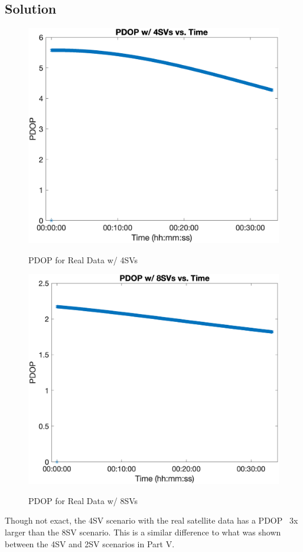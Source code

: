 \documentclass{article}
\begin{document}
\subsection*{Solution}
\begin{figure}[H]
    \centering
    \includegraphics[width=0.75\linewidth]{../figures/p6_4svs_pdop.png}\label{fig:p6_4svs_pdop}
    \caption{PDOP for Real Data w/ 4SVs}
\end{figure}

\begin{figure}[H]
    \centering
    \includegraphics[width=0.75\linewidth]{../figures/p6_8svs_pdop.png}\label{fig:p6_8svs_pdop}
    \caption{PDOP for Real Data w/ 8SVs}
\end{figure}

Though not exact, the 4SV scenario with the real satellite data has a PDOP ~3x larger than the 8SV scenario.  This is a similar 
difference to what was shown between the 4SV and 2SV scenarios in Part V.
\end{document}
